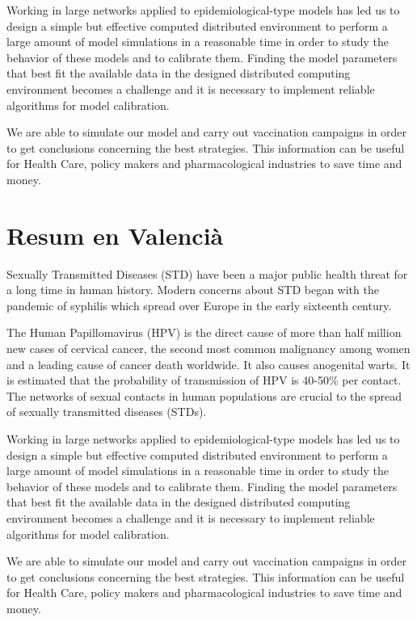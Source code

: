 Working in large networks applied to epidemiological-type models has led us to design a simple but effective computed distributed environment to perform a large amount of model simulations in a reasonable time in order to study the behavior of these models and to calibrate them. Finding the model parameters that best fit the available data in the designed distributed computing environment becomes a challenge and it is necessary to implement reliable algorithms for model calibration.

We are able to simulate our model and carry out vaccination campaigns in order to get conclusions concerning the best strategies. This information can be useful for Health Care, policy makers and pharmacological industries to save time and money.
\chapter*{Resum en Valenci\`a}
Sexually Transmitted Diseases (STD) have been a major public health threat for a long time in human history. Modern concerns about STD began with the pandemic of syphilis which spread over Europe in the early sixteenth century. 

The Human Papillomavirus (HPV) is the direct cause of more than half million new cases of cervical cancer, the second most common malignancy among women and a leading cause of cancer death worldwide. It also causes anogenital warts. It is estimated that the probability of transmission of HPV is 40-50\% per contact. The networks of sexual contacts in human populations are crucial to the spread of sexually transmitted diseases (STDs).

Working in large networks applied to epidemiological-type models has led us to design a simple but effective computed distributed environment to perform a large amount of model simulations in a reasonable time in order to study the behavior of these models and to calibrate them. Finding the model parameters that best fit the available data in the designed distributed computing environment becomes a challenge and it is necessary to implement reliable algorithms for model calibration.

We are able to simulate our model and carry out vaccination campaigns in order to get conclusions concerning the best strategies. This information can be useful for Health Care, policy makers and pharmacological industries to save time and money.